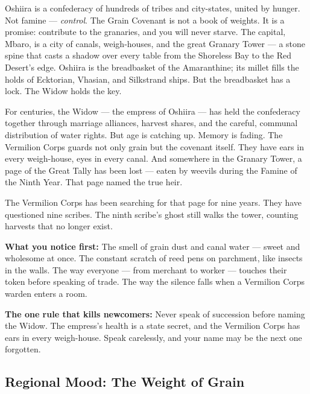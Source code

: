 \vspace{2mm}
\begin{tcolorbox}[colback=black!3,colframe=blue!60!black,title={Theme \& Atmosphere},breakable]
Oshiira is a confederacy of hundreds of tribes and city-states, united by hunger. Not famine --- \textit{control}. The Grain Covenant is not a book of weights. It is a promise: contribute to the granaries, and you will never starve. The capital, Mbaro, is a city of canals, weigh-houses, and the great Granary Tower --- a stone spine that casts a shadow over every table from the Shoreless Bay to the Red Desert's edge. Oshiira is the breadbasket of the Amaranthine; its millet fills the holds of Ecktorian, Vhasian, and Silkstrand ships. But the breadbasket has a lock. The Widow holds the key.

For centuries, the Widow --- the empress of Oshiira --- has held the confederacy together through marriage alliances, harvest shares, and the careful, communal distribution of water rights. But age is catching up. Memory is fading. The Vermilion Corps guards not only grain but the covenant itself. They have ears in every weigh-house, eyes in every canal. And somewhere in the Granary Tower, a page of the Great Tally has been lost --- eaten by weevils during the Famine of the Ninth Year. That page named the true heir.

The Vermilion Corps has been searching for that page for nine years. They have questioned nine scribes. The ninth scribe's ghost still walks the tower, counting harvests that no longer exist.

\vspace{2mm}
\textbf{What you notice first:} The smell of grain dust and canal water --- sweet and wholesome at once. The constant scratch of reed pens on parchment, like insects in the walls. The way everyone --- from merchant to worker --- touches their token before speaking of trade. The way the silence falls when a Vermilion Corps warden enters a room.

\textbf{The one rule that kills newcomers:} Never speak of succession before naming the Widow. The empress's health is a state secret, and the Vermilion Corps has ears in every weigh-house. Speak carelessly, and your name may be the next one forgotten.
\end{tcolorbox}

\subsection*{Regional Mood: The Weight of Grain}

